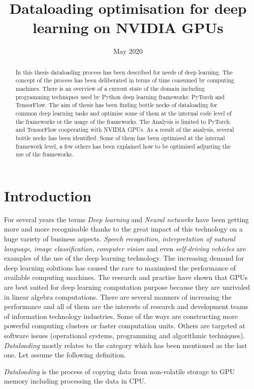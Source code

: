 \documentclass[licencjacka,en]{pracamgr}
\title{Dataloading optimisation for deep learning on NVIDIA GPUs}
\date{May 2020}
\begin{document}
\maketitle

\begin{abstract}
In this thesis dataloading process has been described for needs of deep learning. The concept of the process has been deliberated in terms of time consumed by computing machines. There is an overview of a current state of the domain including programming techniques used by Python deep learning frameworks: PyTorch and TensorFlow. The aim of thesis has been finding bottle necks of dataloading for common deep learning tasks and optimise some of them at the internal code level of the frameworks or the usage of the frameworks. The Analysis is limited to PyTorch and TensorFlow cooperating with NVIDIA GPUs. As a result of the analysis, several bottle necks has been identified. Some of them has been optimised at the internal framework level, a few others has been explained how to be optimised adjusting the use of the frameworks.
\end{abstract}

\tableofcontents

\chapter*{Introduction}

For several years the terms \emph{Deep learning} and \emph{Neural networks} have been getting more and more recognisable thanks to the great impact of this technology on a huge variety of business aspects. \emph{Speech recognition}, \emph{interpretation of natural language}, \emph{image classification}, \emph{computer vision} and even \emph{self-driving vehicles} are examples of the use of the deep learning technology. The increasing demand for deep learning solutions has caused the race to maximised the performance of available computing machines. The research and practise have shown that GPUs are best suited for deep learning computation purpose because they are unrivaled in linear algebra computations. There are several manners of increasing the performance and all of them are the interests of research and development teams of information technology industries. Some of the ways are constructing more powerful computing clusters or faster computation units. Others are targeted at software issues (operational systems, programming and algorithmic techniques). \emph{Dataloading} mostly relates to the category which has been mentioned as the last one. Let assume the following definition.

\emph{Dataloading} is the process of copying data from non-volatile storage to GPU memory including processing the data in CPU.

\end{document}
